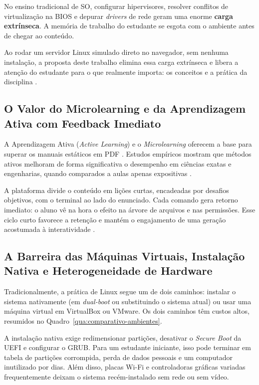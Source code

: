 No ensino tradicional de SO, configurar hipervisores, resolver conflitos de virtualização na BIOS e depurar \textit{drivers} de rede geram uma enorme \textbf{carga extrínseca}. A memória de trabalho do estudante se esgota com o ambiente antes de chegar ao conteúdo.

Ao rodar um servidor Linux simulado direto no navegador, sem nenhuma instalação, a proposta deste trabalho elimina essa carga extrínseca e libera a atenção do estudante para o que realmente importa: os conceitos e a prática da disciplina \cite{paas2003cognitive, guo2013online}.

\subsection{O Valor do Microlearning e da Aprendizagem Ativa com Feedback Imediato}
A Aprendizagem Ativa (\textit{Active Learning}) e o \textit{Microlearning} oferecem a base para superar os manuais estáticos em PDF \cite{freeman2014active, kapp2019microlearning}. Estudos empíricos mostram que métodos ativos melhoram de forma significativa o desempenho em ciências exatas e engenharias, quando comparados a aulas apenas expositivas \cite{freeman2014active}.

A plataforma divide o conteúdo em lições curtas, encadeadas por desafios objetivos, com o terminal ao lado do enunciado. Cada comando gera retorno imediato: o aluno vê na hora o efeito na árvore de arquivos e nas permissões. Esse ciclo curto favorece a retenção e mantém o engajamento de uma geração acostumada à interatividade \cite{guo2013online, kapp2019microlearning}.

\subsection{A Barreira das Máquinas Virtuais, Instalação Nativa e Heterogeneidade de Hardware}

Tradicionalmente, a prática de Linux segue um de dois caminhos: instalar o sistema nativamente (em \textit{dual-boot} ou substituindo o sistema atual) ou usar uma máquina virtual em VirtualBox ou VMware. Os dois caminhos têm custos altos, resumidos no Quadro~\ref{qua:comparativo-ambientes}.

A instalação nativa exige redimensionar partições, desativar o \textit{Secure Boot} da UEFI e configurar o GRUB. Para um estudante iniciante, isso pode terminar em tabela de partições corrompida, perda de dados pessoais e um computador inutilizado por dias. Além disso, placas Wi-Fi e controladoras gráficas variadas frequentemente deixam o sistema recém-instalado sem rede ou sem vídeo.


